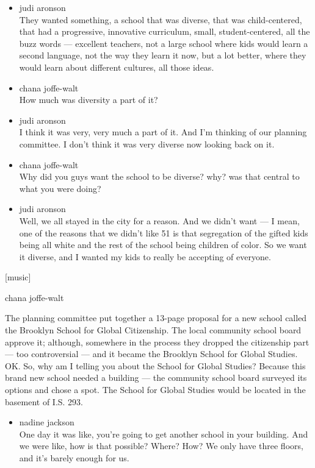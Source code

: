 \begin{itemize}
\item
  judi aronson\\
  They wanted something, a school that was diverse, that was
  child-centered, that had a progressive, innovative curriculum, small,
  student-centered, all the buzz words --- excellent teachers, not a
  large school where kids would learn a second language, not the way
  they learn it now, but a lot better, where they would learn about
  different cultures, all those ideas.
\item
  chana joffe-walt\\
  How much was diversity a part of it?
\item
  judi aronson\\
  I think it was very, very much a part of it. And I'm thinking of our
  planning committee. I don't think it was very diverse now looking back
  on it.
\item
  chana joffe-walt\\
  Why did you guys want the school to be diverse? why? was that central
  to what you were doing?
\item
  judi aronson\\
  Well, we all stayed in the city for a reason. And we didn't want --- I
  mean, one of the reasons that we didn't like 51 is that segregation of
  the gifted kids being all white and the rest of the school being
  children of color. So we want it diverse, and I wanted my kids to
  really be accepting of everyone.
\end{itemize}

{[}music{]}

chana joffe-walt

The planning committee put together a 13-page proposal for a new school
called the Brooklyn School for Global Citizenship. The local community
school board approve it; although, somewhere in the process they dropped
the citizenship part --- too controversial --- and it became the
Brooklyn School for Global Studies. OK. So, why am I telling you about
the School for Global Studies? Because this brand new school needed a
building --- the community school board surveyed its options and chose a
spot. The School for Global Studies would be located in the basement of
I.S. 293.

\begin{itemize}
\tightlist
\item
  nadine jackson\\
  One day it was like, you're going to get another school in your
  building. And we were like, how is that possible? Where? How? We only
  have three floors, and it's barely enough for us.
\end{itemize}


